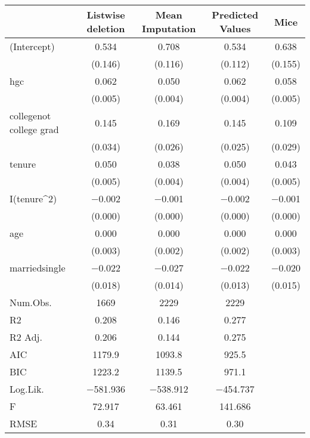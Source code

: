 \documentclass{article}
\begin{document}
\begin{table}
\centering
\begin{tabular}[t]{lcccc}
\toprule
  & Listwise deletion & Mean Imputation & Predicted Values & Mice\\
\midrule
(Intercept) & \num{0.534} & \num{0.708} & \num{0.534} & \num{0.638}\\
 & (\num{0.146}) & (\num{0.116}) & (\num{0.112}) & (\num{0.155})\\
hgc & \num{0.062} & \num{0.050} & \num{0.062} & \num{0.058}\\
 & (\num{0.005}) & (\num{0.004}) & (\num{0.004}) & \vphantom{1} (\num{0.005})\\
collegenot college grad & \num{0.145} & \num{0.169} & \num{0.145} & \num{0.109}\\
 & (\num{0.034}) & (\num{0.026}) & (\num{0.025}) & (\num{0.029})\\
tenure & \num{0.050} & \num{0.038} & \num{0.050} & \num{0.043}\\
 & (\num{0.005}) & (\num{0.004}) & (\num{0.004}) & (\num{0.005})\\
I(tenure\textasciicircum2) & \num{-0.002} & \num{-0.001} & \num{-0.002} & \num{-0.001}\\
 & (\num{0.000}) & (\num{0.000}) & (\num{0.000}) & (\num{0.000})\\
age & \num{0.000} & \num{0.000} & \num{0.000} & \num{0.000}\\
 & (\num{0.003}) & (\num{0.002}) & (\num{0.002}) & (\num{0.003})\\
marriedsingle & \num{-0.022} & \num{-0.027} & \num{-0.022} & \num{-0.020}\\
 & (\num{0.018}) & (\num{0.014}) & (\num{0.013}) & (\num{0.015})\\
\midrule
Num.Obs. & \num{1669} & \num{2229} & \num{2229} & \\
R2 & \num{0.208} & \num{0.146} & \num{0.277} & \\
R2 Adj. & \num{0.206} & \num{0.144} & \num{0.275} & \\
AIC & \num{1179.9} & \num{1093.8} & \num{925.5} & \\
BIC & \num{1223.2} & \num{1139.5} & \num{971.1} & \\
Log.Lik. & \num{-581.936} & \num{-538.912} & \num{-454.737} & \\
F & \num{72.917} & \num{63.461} & \num{141.686} & \\
RMSE & \num{0.34} & \num{0.31} & \num{0.30} & \\
\bottomrule
\end{tabular}
\end{table}
\end{document}
